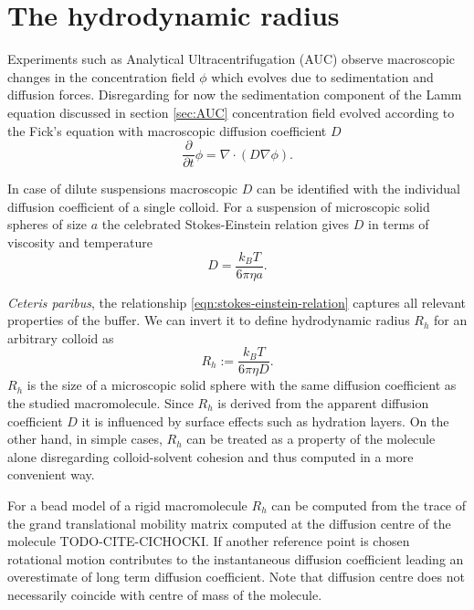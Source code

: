 \documentclass{doctoral}
\newcommand{\pd}{\partial}
\begin{document}
\section{The hydrodynamic radius}

Experiments such as Analytical Ultracentrifugation (AUC) observe macroscopic changes in the concentration field $\phi$ which evolves due to sedimentation and diffusion forces.
Disregarding for now the sedimentation component of the Lamm equation discussed in section \ref{sec:AUC} concentration field evolved according to the Fick's equation with macroscopic diffusion coefficient $D$
\begin{equation}
    \frac{\pd}{\pd t} \phi = \nabla \cdot ( D \nabla \phi ).
    \label{eqn:ficks-law}
\end{equation}

In case of dilute suspensions macroscopic $D$ can be identified with the individual diffusion coefficient of a single colloid.
For a suspension of microscopic solid spheres of size $a$ the celebrated Stokes-Einstein relation gives $D$ in terms of viscosity and temperature
\begin{equation}
    D = \frac{k_B T}{6 \pi \eta a}.
    \label{eqn:stokes-einstein-relation}
\end{equation}

\textit{Ceteris paribus}, the relationship \eqref{eqn:stokes-einstein-relation} captures all relevant properties of the buffer.
We can invert it to define hydrodynamic radius $R_h$ for an arbitrary colloid as
\begin{equation}
    R_h :=  \frac{k_B T}{6 \pi \eta D}.
    \label{eqn:hydrodynamic-radius-definition}
\end{equation}
$R_h$ is the size of a microscopic solid sphere with the same diffusion coefficient as the studied macromolecule.
Since $R_h$ is derived from the apparent diffusion coefficient $D$ it is influenced by surface effects such as hydration layers.
On the other hand, in simple cases, $R_h$ can be treated as a property of the molecule alone disregarding colloid-solvent cohesion and thus computed in a more convenient way.

For a bead model of a rigid macromolecule $R_h$ can be computed from the trace of the grand translational mobility matrix computed at the diffusion centre of the molecule TODO-CITE-CICHOCKI.
If another reference point is chosen rotational motion contributes to the instantaneous diffusion coefficient leading an overestimate of long term diffusion coefficient.
Note that diffusion centre does not necessarily coincide with centre of mass of the molecule.
\end{document}
